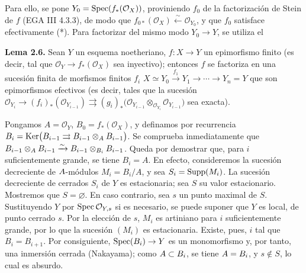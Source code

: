 Para ello, se pone \(Y_0=\Spec(f_*(\mathcal O_X))\), proviniendo \(f_0\) de
la factorización de Stein de \(f\) (EGA III 4.3.3), de modo que
\(f_{0*}(\mathcal O_X)\xleftarrow{\sim}\mathcal O_{Y_0}\), y que \(f_0\)
satisface efectivamente (*). Para factorizar del mismo modo \(Y_0\to Y\), se
utiliza el

\textbf{Lema 2.6.} Sean \(Y\) un esquema noetheriano,
\(f:X\to Y\) un epimorfismo finito (es decir, tal que
\(\mathcal O_Y\to f_*(\mathcal O_X)\) sea inyectivo); entonces \(f\) se
factoriza en una sucesión finita de morfismos finitos \(f_i\)
\(X\simeq Y_0\xrightarrow{f_1}Y_1\longrightarrow\cdots\longrightarrow Y_n=Y\)
que son epimorfismos efectivos (es decir, tales que la sucesión
\(\mathcal O_{Y_i}\longrightarrow (f_i)_*(\mathcal O_{Y_{i-1}})\rightrightarrows (g_i)_*\bigl(\mathcal O_{Y_{i-1}}\otimes_{\mathcal O_{Y_i}}\mathcal O_{Y_{i-1}}\bigr)\)
sea exacta).

Pongamos \(A=\mathcal O_Y\), \(B_0=f_*(\mathcal O_X)\), y definamos por
recurrencia
\(B_i=\Ker\bigl(B_{i-1}\rightrightarrows B_{i-1}\otimes_A B_{i-1}\bigr)\).
Se comprueba inmediatamente que
\(B_{i-1}\otimes_A B_{i-1}\xrightarrow{\sim}B_{i-1}\otimes_{\sisi{A_i}{B_i}}B_{i-1}\). %
Queda por demostrar que, para \(i\) suficientemente grande, se tiene
\(B_i=A\). En efecto, consideremos la sucesión decreciente de
\(\sisi{B}{A}\)-módulos \(M_i=B_i/A\), y sea \(S_i=\Supp(M_i)\). La sucesión
decreciente de cerrados \(S_i\) de \(Y\) es estacionaria; sea \(S\) su valor
estacionario. Mostremos que \(S=\varnothing\). En caso contrario, sea \(s\)
un punto maximal de \(S\). Sustituyendo \(Y\) por
\(\Spec\mathcal O_{Y,s}\) si es necesario, se puede suponer que \(Y\) es
local, de punto cerrado \(s\). Por la elección de \(s\), \(M_i\) es
artiniano para \(i\) suficientemente grande, por lo que la sucesión
\((M_i)\) es estacionaria. Existe, pues, \(i\) tal que \(B_i=B_{i+1}\). Por
consiguiente, \(\Spec(\sisi{A_i}{B_i})\to Y\) es un monomorfismo y, por tanto, una
inmersión cerrada (Nakayama); como \(\sisi{B\subset A_i}{A\subset B_i}\), se tiene \(\sisi{B=A_i}{A=B_i}\), y
\(s\notin S\), lo cual es absurdo.
